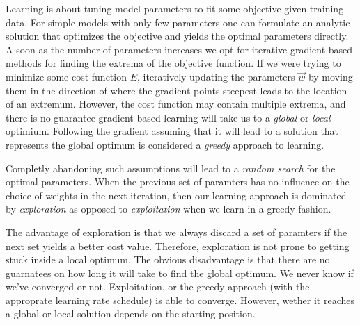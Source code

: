 
Learning is about tuning model parameters to fit some objective given training data. 
For simple models with only few parameters one can formulate an analytic solution that optimizes the objective and yields the optimal parameters directly. 
A soon as the number of parameters increases we opt for iterative gradient-based methods for finding the extrema of the objective function. If we were trying to minimize some cost function $E$, 
iteratively updating the parameters $\vec w$ by moving them in the direction of where the gradient points steepest leads to the location of an extremum. 
However, the cost function may contain multiple extrema, and there is no guarantee gradient-based learning will take us to a \emph{global} or \emph{local} optimium. 
Following the gradient assuming that it will lead to a solution that represents the global optimum is considered a \emph{greedy} approach to learning. 

Completly abandoning such assumptions will lead to a \emph{random search} for the optimal parameters. When the previous set of paramters has no influence on the choice of weights in the next iteration, 
then our learning approach is dominated by \emph{exploration} as opposed to \emph{exploitation} when we learn in a greedy fashion.


The advantage of exploration is that we always discard a set of paramters if the next set yields a better cost value. Therefore, exploration is not prone to getting stuck inside a local optimum. The obvious disadvantage is that there are no guarnatees on how long it will take to find the global optimum. We never know if we've converged or not. Exploitation, or the greedy approach (with the approprate learning rate schedule) is able to converge. However, wether it reaches a global or local solution depends on the starting position.

